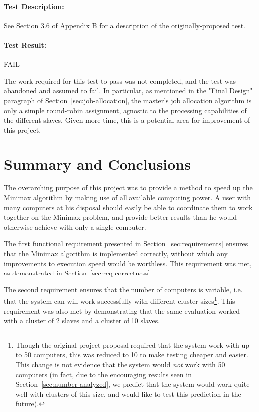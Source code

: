 \documentclass[pdftex,12pt,a4paper]{article}
\begin{document}
\paragraph{Test Description:} See Section 3.6 of Appendix B for a description of the originally-proposed test.

\paragraph{Test Result:} FAIL

The work required for this test to pass was not completed, and the test was abandoned and assumed to fail. In particular, as mentioned in the "Final Design" paragraph of Section~\ref{sec:job-allocation}, the master's job allocation algorithm is only a simple round-robin assignment, agnostic to the processing capabilities of the different slaves. Given more time, this is a potential area for improvement of this project.

%
%
\section{Summary and Conclusions}

The overarching purpose of this project was to provide a method to speed up the Minimax algorithm by making use of all available computing power. A user with many computers at his disposal should easily be able to coordinate them to work together on the Minimax problem, and provide better results than he would otherwise achieve with only a single computer.

The first functional requirement presented in Section~\ref{sec:requirements} ensures that the Minimax algorithm is implemented correctly, without which any improvements to execution speed would be worthless. This requirement was met, as demonstrated in Section~\ref{sec:req-correctness}.

The second requirement ensures that the number of computers is variable, i.e. that the system can will work successfully with different cluster sizes\footnote{Though the original project proposal required that the system work with up to 50 computers, this was reduced to 10 to make testing cheaper and easier. This change is not evidence that the system would \emph{not} work with 50 computers (in fact, due to the encouraging results seen in Section~\ref{sec:number-analyzed}, we predict that the system would work quite well with clusters of this size, and would like to test this prediction in the future).}. This requirement was also met by demonstrating that the same evaluation worked with a cluster of 2 slaves and a cluster of 10 slaves.
\end{document}
